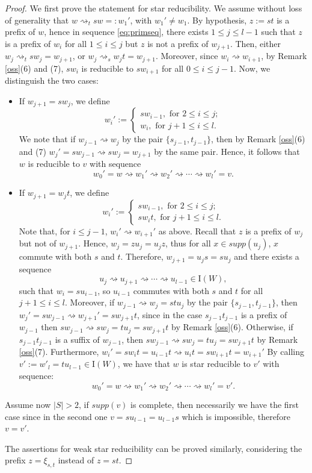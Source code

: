 \documentclass{amsart}
\newcommand{\I}{\mathrm{I}}
\newcommand{\red}{\rightsquigarrow}
\theoremstyle{definition}
\begin{document}
\begin{proof}
    We first prove the statement for star reducibility. 
    We assume without loss of generality that $w\red_tsw=:w_1'$, with $w_1'\ne w_1$. By hypothesis, $z:=st$ is a prefix of $w$, hence in sequence \eqref{eq:primseq}, there exists $1\le j\le l-1$ such that $z$ is a prefix of $w_i$ for all $1\le i\le j$ but $z$ is not a prefix of $w_{j+1}$. Then, either $w_j\red_t sw_j=w_{j+1}$, or $w_j\red_s w_jt=w_{j+1}$.   
    Moreover, since $w_i \red w_{i+1}$, by Remark \ref{oss}(6) and (7), $sw_i$ is reducible to $sw_{i+1}$ for all $0\le i\le j-1$.
    Now, we distinguish the two cases:
    \begin{itemize}
        \item If $w_{j+1}=sw_j$, we define \[w_i':=\begin{cases} sw_{i-1},\mbox{ for }2\le i\le j; \\
        w_i, \mbox{ for } j+1\le i\le l. \end{cases}\] We note that if $w_{j-1}\red w_j$ by the pair $\{s_{j-1},t_{j-1}\}$, then by Remark \ref{oss}(6) and (7) $w_j'=sw_{j-1}\red sw_j=w_{j+1}$ by the same pair. Hence, it follows that $w$ is reducible to $v$ with sequence \[w_0'=w\red w_1'\red w_2'\red \cdots \red w_l'=v.\]
        \item If $w_{j+1} =w_jt$, we define \[w_i':=\begin{cases}
            sw_{i-1}, \mbox{ for } 2\le i \le j; \\
            sw_{i}t, \mbox{ for } j+1\le i \le l. 
        \end{cases} \] Note that, for $i\le j-1$, $w_{i}'\red w_{i+1}'$ as above. Recall that $z$ is a prefix of $w_{j}$ but not of $w_{j+1}$. Hence, $w_j=zu_j=u_jz$, thus for all $x\in supp(u_j)$, $x$ commute with both $s$ and $t$. Therefore, $w_{j+1}=u_js=su_j$ and there exists a sequence \[u_j\red u_{j+1}\red \cdots \red u_{l-1}\in \I(W),\] such that $w_i=su_{i-1}$, so $u_{i-1}$ commutes with both $s$ and $t$ for all $j+1\le i\le l$. Moreover, if $w_{j-1}\red w_j=stu_j$ by the pair $\{s_{j-1},t_{j-1}\}$, then $w_{j}'=sw_{j-1}\red w_{j+1}'=sw_{j+1}t$, since in the case $s_{j-1}t_{j-1}$ is a prefix of $w_{j-1}$ then $sw_{j-1}\red sw_{j}=tu_{j}=sw_{j+1}t$ by Remark \ref{oss}(6). Otherwise, if $s_{j-1}t_{j-1}$ is a suffix of $w_{j-1}$, then $sw_{j-1}\red sw_{j}=tu_{j}=sw_{j+1}t$ by Remark \ref{oss}(7). Furthermore, $w_{i}'=sw_it=u_{i-1}t\red u_it=sw_{i+1}t=w_{i+1}'$
        By calling $v':=w'_l=tu_{l-1}\in\I(W)$, we have that $w$ is star reducible to $v'$ with sequence:
       \[w_0'=w\red w_1'\red w_2'\red  \cdots \red w_l'=v'.\]
    \end{itemize}
    Assume now $|S|>2$, if $supp(v)$ is complete, then necessarily we have the first case since in the second one $v=su_{l-1}=u_{l-1}s$ which is impossible, therefore $v=v'$.

    The assertions for weak star reducibility can be proved similarly, considering the prefix $z=\xi_{s,t}$ instead of $z=st$. 
\end{proof}
\end{document}
